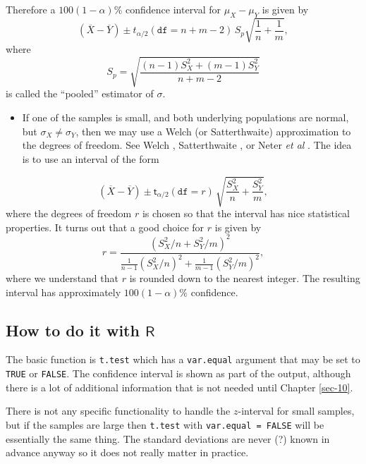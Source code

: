 \documentclass[captions=tableheading]{scrbook}
\begin{document}
Therefore a \(100(1-\alpha)\%\) confidence interval for \(\mu_{X}-\mu_{Y}\) is given by
\begin{equation}
\left(\overline{X}-\overline{Y}\right)\pm t_{\alpha/2}(\mathtt{df}=n+m-2)\, S_{p}\sqrt{\frac{1}{n}+\frac{1}{m}},
\end{equation}
where
\begin{equation}
S_{p}=\sqrt{\frac{(n-1)S_{X}^{2}+(m-1)S_{Y}^{2}}{n+m-2}}
\end{equation}
is called the ``pooled'' estimator of \(\sigma\).
\begin{itemize}
\item If one of the samples is small, and both underlying populations are normal, but \(\sigma_{X}\neq\sigma_{Y}\), then we may use a Welch (or Satterthwaite) approximation to the degrees of freedom. See Welch \cite{Welch1947}, Satterthwaite \cite{Satterthwaite1946}, or Neter \emph{et al} \cite{Neter1996}. The idea is to use an interval of the form
\end{itemize}
\begin{equation}
\left(\overline{X}-\overline{Y}\right)\pm\mathsf{t}_{\alpha/2}(\mathtt{df}=r)\,\sqrt{\frac{S_{X}^{2}}{n}+\frac{S_{Y}^{2}}{m}},
\end{equation}
where the degrees of freedom \(r\) is chosen so that the interval has nice statistical properties. It turns out that a good choice for \(r\) is given by
\begin{equation}
r=\frac{\left(S_{X}^{2}/n+S_{Y}^{2}/m\right)^{2}}{\frac{1}{n-1}\left(S_{X}^{2}/n\right)^{2}+\frac{1}{m-1}\left(S_{Y}^{2}/m\right)^{2}},
\end{equation}
where we understand that \(r\) is rounded down to the nearest integer. The resulting interval has approximately \(100(1-\alpha)\%\) confidence.
\subsection{How to do it with \(\mathsf{R}\)}
\label{sec-9-3-1}


The basic function is \texttt{t.test} which has a \texttt{var.equal} argument that may be set to \texttt{TRUE} or \texttt{FALSE}. The confidence interval is shown as part of the output, although there is a lot of additional information that is not needed until Chapter \ref{sec-10}.

There is not any specific functionality to handle the \(z\)-interval for small samples, but if the samples are large then \texttt{t.test} with \texttt{var.equal = FALSE} will be essentially the same thing. The standard deviations are never (?) known in advance anyway so it does not really matter in practice. 
\end{document}
